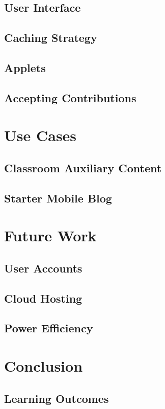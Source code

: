 \documentclass[12pt]{report}
\begin{document}
    \section{User Interface}
    \section{Caching Strategy}
    \section{Applets}
    \section{Accepting Contributions}

\chapter{Use Cases}
    \section{Classroom Auxiliary Content}
    \section{Starter Mobile Blog}

\chapter{Future Work}
    \section{User Accounts}
    \section{Cloud Hosting}
    \section{Power Efficiency}

\chapter{Conclusion}
    \section{Learning Outcomes}
\end{document}
